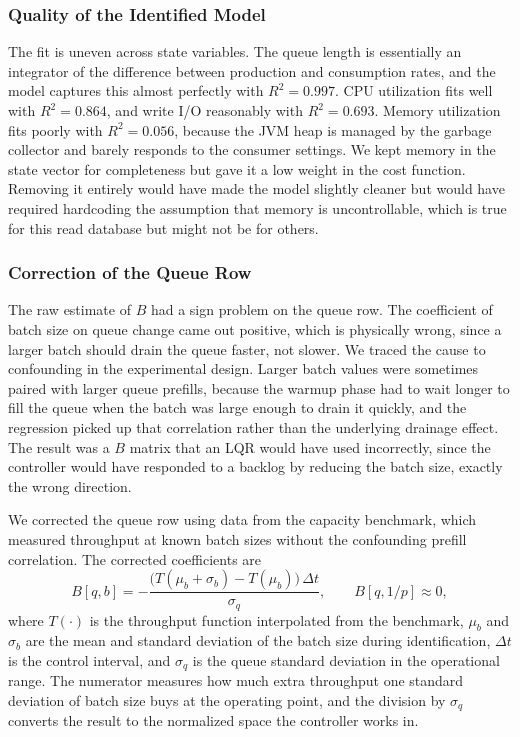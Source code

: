 \documentclass[10pt,a4paper]{article}
\begin{document}
\subsubsection{Quality of the Identified Model}

The fit is uneven across state variables. The queue length is essentially an integrator of the difference between production and consumption rates, and the model captures this almost perfectly with $R^2 = 0.997$. CPU utilization fits well with $R^2 = 0.864$, and write I/O reasonably with $R^2 = 0.693$. Memory utilization fits poorly with $R^2 = 0.056$, because the JVM heap is managed by the garbage collector and barely responds to the consumer settings. We kept memory in the state vector for completeness but gave it a low weight in the cost function. Removing it entirely would have made the model slightly cleaner but would have required hardcoding the assumption that memory is uncontrollable, which is true for this read database but might not be for others.

\subsubsection{Correction of the Queue Row}

The raw estimate of $B$ had a sign problem on the queue row. The coefficient of batch size on queue change came out positive, which is physically wrong, since a larger batch should drain the queue faster, not slower. We traced the cause to confounding in the experimental design. Larger batch values were sometimes paired with larger queue prefills, because the warmup phase had to wait longer to fill the queue when the batch was large enough to drain it quickly, and the regression picked up that correlation rather than the underlying drainage effect. The result was a $B$ matrix that an LQR would have used incorrectly, since the controller would have responded to a backlog by reducing the batch size, exactly the wrong direction.

We corrected the queue row using data from the capacity benchmark, which measured throughput at known batch sizes without the confounding prefill correlation. The corrected coefficients are
\begin{equation}
B[q,b] = -\frac{\bigl(T(\mu_b + \sigma_b) - T(\mu_b)\bigr)\,\Delta t}{\sigma_q}, \qquad B[q, 1/p] \approx 0,
\end{equation}
where $T(\cdot)$ is the throughput function interpolated from the benchmark, $\mu_b$ and $\sigma_b$ are the mean and standard deviation of the batch size during identification, $\Delta t$ is the control interval, and $\sigma_q$ is the queue standard deviation in the operational range. The numerator measures how much extra throughput one standard deviation of batch size buys at the operating point, and the division by $\sigma_q$ converts the result to the normalized space the controller works in.
\end{document}
